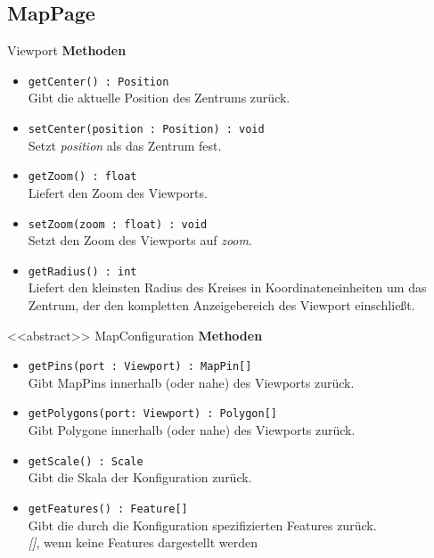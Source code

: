 \subsection{MapPage}

    \begin{Class}{Viewport}
        \textbf{Methoden}
        \begin{itemize}
            \item \texttt{getCenter() : Position}
            \\ Gibt die aktuelle Position des Zentrums zurück.
            \item \texttt{setCenter(position : Position) : void}
            \\ Setzt \emph{position} als das Zentrum fest.
            \item \texttt{getZoom() : float}
            \\ Liefert den Zoom des Viewports.
            \item \texttt{setZoom(zoom : float) : void}
            \\ Setzt den Zoom des Viewports auf \emph{zoom}.
            \item \texttt{getRadius() : int}
            \\ Liefert den kleinsten Radius des Kreises in Koordinateneinheiten um das Zentrum,
            der den kompletten Anzeigebereich des Viewport einschließt.
        \end{itemize}
    \end{Class}

    \begin{Class}{<<abstract>> MapConfiguration}
        \textbf{Methoden}
        \begin{itemize}
            \item \texttt{getPins(port : Viewport) : MapPin[]}
            \\ Gibt MapPins innerhalb (oder nahe) des Viewports zurück.
            \item \texttt{getPolygons(port: Viewport) : Polygon[]}
            \\ Gibt Polygone innerhalb (oder nahe) des Viewports zurück.
            \item \texttt{getScale() : Scale}
            \\ Gibt die Skala der Konfiguration zurück.
            \item \texttt{getFeatures() : Feature[]}
            \\ Gibt die durch die Konfiguration spezifizierten Features zurück.
            \\ \emph{[]}, wenn keine Features dargestellt werden
        \end{itemize}
    \end{Class}


